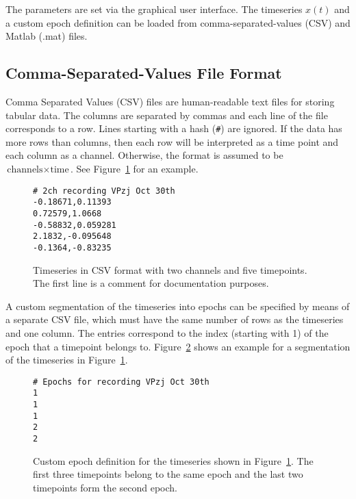 \documentclass{article}
\newcommand{\1}{\ensuremath{\mathds{1}}}
\newcommand{\0}{\ensuremath{0}}
\begin{document}
The parameters are set via the graphical user interface. The timeseries 
$x(t)$ and a custom epoch definition can be loaded from comma-separated-values
(CSV) and Matlab (.mat) files.

\subsection{Comma-Separated-Values File Format}
\label{sec:csv_input}

Comma Separated Values (CSV) files are human-readable text files for storing tabular data. 
The columns are separated by commas and each line of the file corresponds to a row. 
Lines starting with a hash (\texttt{\#}) are ignored. If the data has more rows than columns,
then each row will be interpreted as a time point and each column as a channel. Otherwise,
the format is assumed to be $\text{channels} \times \text{time}$. See 
Figure~\ref{fig:ex_timeseries} for an example.

\begin{figure}[h]
\centering
\begin{boxedminipage}{10cm}
\begin{verbatim}
# 2ch recording VPzj Oct 30th
-0.18671,0.11393
0.72579,1.0668
-0.58832,0.059281
2.1832,-0.095648
-0.1364,-0.83235
\end{verbatim}
\end{boxedminipage}
\caption{
Timeseries in CSV format with two channels and five timepoints. 
The first line is a comment for documentation purposes.
\label{fig:ex_timeseries}
}
\end{figure}

A custom segmentation of the timeseries into epochs can be specified by means of 
a separate CSV file, which must have the same number of rows as the timeseries 
and one column. The entries correspond to the index (starting with 1) of the 
epoch that a timepoint belongs to. Figure~\ref{fig:ex_segmentation} shows 
an example for a segmentation of the timeseries in Figure~\ref{fig:ex_timeseries}.

\begin{figure}[h]
\centering
\begin{boxedminipage}{10cm}
\begin{verbatim}
# Epochs for recording VPzj Oct 30th
1
1
1
2
2
\end{verbatim}
\end{boxedminipage}
\caption{
Custom epoch definition for the timeseries shown in Figure~\ref{fig:ex_timeseries}. 
The first three timepoints belong to the same epoch and the last two timepoints form the
second epoch.
\label{fig:ex_segmentation}
}
\end{figure}
\end{document}
